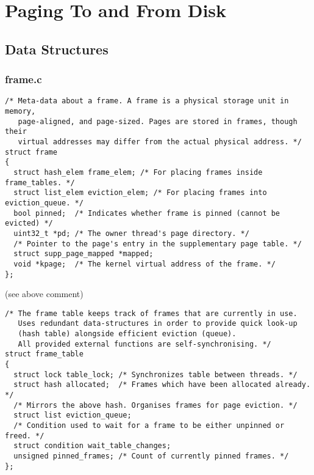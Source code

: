 \section{Paging To and From Disk}

\subsection{Data Structures}

\subsubsection*{frame.c}

\begin{verbatim}
/* Meta-data about a frame. A frame is a physical storage unit in memory,
   page-aligned, and page-sized. Pages are stored in frames, though their
   virtual addresses may differ from the actual physical address. */
struct frame
{
  struct hash_elem frame_elem; /* For placing frames inside frame_tables. */
  struct list_elem eviction_elem; /* For placing frames into eviction_queue. */
  bool pinned;  /* Indicates whether frame is pinned (cannot be evicted) */
  uint32_t *pd; /* The owner thread's page directory. */
  /* Pointer to the page's entry in the supplementary page table. */
  struct supp_page_mapped *mapped;
  void *kpage;  /* The kernel virtual address of the frame. */
};
\end{verbatim}

(see above comment)

\begin{verbatim}
/* The frame table keeps track of frames that are currently in use.
   Uses redundant data-structures in order to provide quick look-up
   (hash table) alongside efficient eviction (queue).
   All provided external functions are self-synchronising. */
struct frame_table
{
  struct lock table_lock; /* Synchronizes table between threads. */
  struct hash allocated;  /* Frames which have been allocated already. */
  /* Mirrors the above hash. Organises frames for page eviction. */
  struct list eviction_queue;
  /* Condition used to wait for a frame to be either unpinned or freed. */
  struct condition wait_table_changes;
  unsigned pinned_frames; /* Count of currently pinned frames. */
};
\end{verbatim}


